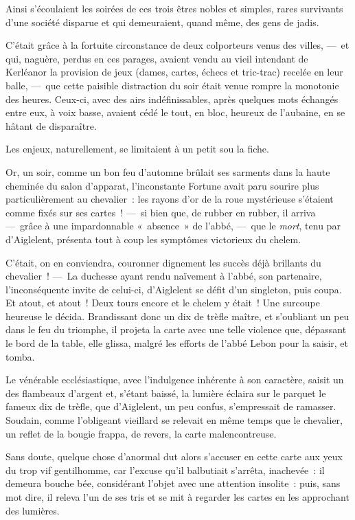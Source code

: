 \documentclass[french,twoside]{book} %
\begin{document}
Ainsi s’écoulaient les soirées de ces trois êtres nobles et simples, rares survivants d’une société disparue et qui demeuraient, quand même, des gens de jadis.\par
C’était grâce à la fortuite circonstance de deux colporteurs venus des villes, — et qui, naguère, perdus en ces parages, avaient vendu au vieil intendant de Kerléanor la provision de jeux (dames, cartes, échecs et tric-trac) recelée en leur balle, — que cette paisible distraction du soir était venue rompre la monotonie des heures. Ceux-ci, avec des airs indéfinissables,   après quelques mots échangés entre eux, à voix basse, avaient cédé le tout, en bloc, heureux de l’aubaine, en se hâtant de disparaître.\par
Les enjeux, naturellement, se limitaient à un petit sou la fiche.\par
Or, un soir, comme un bon feu d’automne brûlait ses sarments dans la haute cheminée du salon d’apparat, l’inconstante Fortune avait paru sourire plus particulièrement au chevalier : les rayons d’or de la roue mystérieuse s’étaient comme fixés sur ses cartes ! — si bien que, de rubber en rubber, il arriva— grâce à une impardonnable « absence » de l’abbé, — que le \emph{mort}, tenu par d’Aiglelent, présenta tout à coup les symptômes victorieux du chelem.\par
C’était, on en conviendra, couronner dignement les succès déjà brillants du chevalier ! — La duchesse ayant rendu naïvement à l’abbé, son partenaire, l’inconséquente invite de celui-ci, d’Aiglelent se défit d’un singleton, puis coupa. Et atout, et atout ! Deux tours encore et le chelem y était ! Une surcoupe heureuse le décida. Brandissant donc un dix de trèfle maître, et   s’oubliant un peu dans le feu du triomphe, il projeta la carte avec une telle violence que, dépassant le bord de la table, elle glissa, malgré les efforts de l’abbé Lebon pour la saisir, et tomba.\par
Le vénérable ecclésiastique, avec l’indulgence inhérente à son caractère, saisit un des flambeaux d’argent et, s’étant baissé, la lumière éclaira sur le parquet le fameux dix de trèfle, que d’Aiglelent, un peu confus, s’empressait de ramasser. Soudain, comme l’obligeant vieillard se relevait en même temps que le chevalier, un reflet de la bougie frappa, de revers, la carte malencontreuse.\par
Sans doute, quelque chose d’anormal dut alors s’accuser en cette carte aux yeux du trop vif gentilhomme, car l’excuse qu’il balbutiait s’arrêta, inachevée : il demeura bouche bée, considérant l’objet avec une attention insolite : puis, sans mot dire, il releva l’un de ses tris et se mit à regarder les cartes en les approchant des lumières.\par
\end{document}
